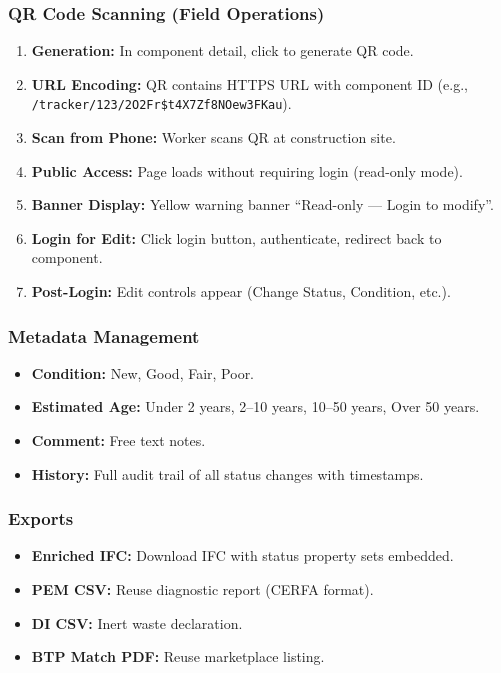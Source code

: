 \documentclass[11pt,a4paper]{article}
\begin{document}
\subsubsection{QR Code Scanning (Field Operations)}

\begin{enumerate}[leftmargin=*]
    \item \textbf{Generation:} In component detail, click to generate QR code.
    \item \textbf{URL Encoding:} QR contains HTTPS URL with component ID (e.g., \texttt{/tracker/123/2O2Fr\$t4X7Zf8NOew3FKau}).
    \item \textbf{Scan from Phone:} Worker scans QR at construction site.
    \item \textbf{Public Access:} Page loads without requiring login (read-only mode).
    \item \textbf{Banner Display:} Yellow warning banner ``Read-only --- Login to modify''.
    \item \textbf{Login for Edit:} Click login button, authenticate, redirect back to component.
    \item \textbf{Post-Login:} Edit controls appear (Change Status, Condition, etc.).
\end{enumerate}

\subsubsection{Metadata Management}

\begin{itemize}
    \item \textbf{Condition:} New, Good, Fair, Poor.
    \item \textbf{Estimated Age:} Under 2 years, 2--10 years, 10--50 years, Over 50 years.
    \item \textbf{Comment:} Free text notes.
    \item \textbf{History:} Full audit trail of all status changes with timestamps.
\end{itemize}

\subsubsection{Exports}

\begin{itemize}
    \item \textbf{Enriched IFC:} Download IFC with status property sets embedded.
    \item \textbf{PEM CSV:} Reuse diagnostic report (CERFA format).
    \item \textbf{DI CSV:} Inert waste declaration.
    \item \textbf{BTP Match PDF:} Reuse marketplace listing.
\end{itemize}
\end{document}
